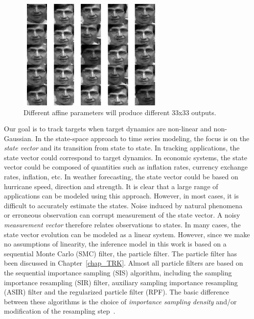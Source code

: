 \begin{Body}
								\begin{figure}[t]
								\centering
								\includegraphics[width=0.65\textwidth]{thesis/affineCandidates.pdf}
								\caption{Different affine parameters will produce different 33x33 outputs.}
								\label{Fig:affine_candidates}
								\end{figure}

Our goal is to track targets when target dynamics are non-linear and non-Gaussian.  In the state-space approach to time series modeling, the focus is on the \emph{state vector} and its transition from state to state.  In tracking applications, the state vector could correspond to target dynamics.  In economic systems, the state vector could be composed of quantities such as inflation rates, currency exchange rates, inflation, etc.  In weather forecasting, the state vector could be based on hurricane speed, direction and strength.  It is clear that a large range of applications can be modeled using this approach.  However, in most cases, it is difficult to accurately estimate the states.  Noise induced by natural phenomena or erroneous observation can corrupt measurement of the state vector.  A noisy \emph{measurement vector} therefore relates observations to states.  In many cases, the state vector evolution can be modeled as a linear system.  However, since we make no assumptions of linearity, the inference model in this work is based on a sequential Monte Carlo (SMC) filter, the particle filter.  The particle filter has been discussed in Chapter~\ref{chap_TRK}.  Almost all particle filters are based on the sequential importance sampling (SIS) algorithm, including the sampling importance resampling (SIR) filter, auxiliary sampling importance resampling (ASIR) filter and the regularized particle filter (RPF).  The basic difference between these algorithms is the choice of \emph{importance sampling density} and/or modification of the resampling step~\cite{2002_JNL_PF_Arulampalam}.  


\end{Body}
